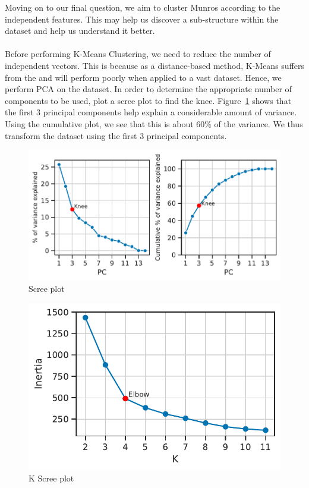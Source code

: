 \documentclass[11pt,a4paper]{article}
\begin{document}
Moving on to our final question, we aim to cluster Munros according to the independent features. This may help us discover a sub-structure within the dataset and help us understand it better. \\ \\
Before performing K-Means Clustering, we need to reduce the number of independent vectors. This is because as a distance-based method, K-Means suffers from the  and will perform poorly when applied to a vast dataset. Hence, we perform PCA on the dataset. In order to determine the appropriate number of components to be used, plot a scree plot to find the knee. Figure~\ref{fds-project-template:fig:scree_plot} shows that the first 3 principal components help explain a considerable amount of variance. Using the cumulative plot, we see that this is about $60\%$ of the variance. We thus transform the dataset using the first 3 principal components.
\begin{figure} [h!]
  \centering
  \includegraphics{report/scree_plot.pdf}
  \caption{Scree plot}
  \label{fds-project-template:fig:scree_plot}
\end{figure}
\begin{figure} [h!]
  \centering
  \includegraphics{report/k_screeplot.pdf}
  \caption{K Scree plot}
  \label{fds-project-template:fig:k_screeplot}
\end{figure} \\ \\
\end{document}
